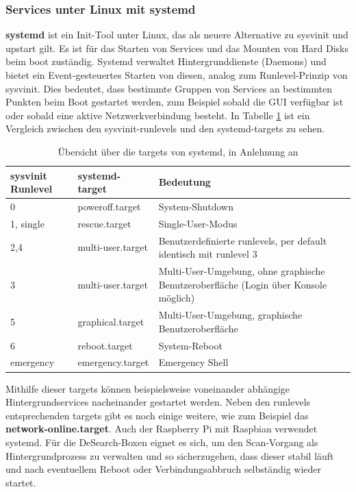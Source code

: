 \subsubsection{Services unter Linux mit systemd}\label{sssec:systemd}
\textbf{systemd} ist ein Init-Tool unter Linux, das als neuere Alternative zu sysvinit und upstart gilt. Es ist für das Starten von Services und das Mounten von Hard Disks beim boot zuständig. Systemd verwaltet Hintergrunddienste (Daemons) und bietet ein Event-gesteuertes Starten von diesen, analog zum Runlevel-Prinzip von sysvinit. Dies bedeutet, dass bestimmte Gruppen von Services an bestimmten Punkten beim Boot gestartet werden, zum Beispiel sobald die GUI verfügbar ist oder sobald eine aktive Netzwerkverbindung besteht. In Tabelle \ref{tab:lvl} ist ein Vergleich zwischen den sysvinit-runlevels und den systemd-targets zu sehen. 
\begin{table}[h]
	\begin{tabular}{|p{}|p{} |p{} | }
		\hline
		\textbf{sysvinit Runlevel} & \textbf{systemd-target} & \textbf{Bedeutung}\\ \hline
		0 & poweroff.target & System-Shutdown	\\ \hline
		1, single & rescue.target & Single-User-Modus \\ \hline
		2,4 & multi-user.target & Benutzerdefinierte runlevels, per default identisch mit runlevel 3 \\ \hline
		3 & multi-user.target & Multi-User-Umgebung, ohne graphische Benutzer\-oberfläche (Login über Konsole möglich)\\ \hline
		5 & graphical.target & Multi-User-Umgebung, graphische Benutzer\-oberfläche \\ \hline
		6 & reboot.target & System-Reboot \\ \hline
		emergency & emergency.target & Emergency Shell\\ \hline
		
	\end{tabular}
	\caption[Übersicht über die targets von systemd]{Übersicht über die targets von systemd, in Anlehnung an \cite{fedora}}
	\label{tab:lvl}
\end{table}
Mithilfe dieser targets können beispielsweise voneinander abhängige Hintergrundservices nacheinander gestartet werden. Neben den runlevels entsprechenden targets gibt es noch einige weitere, wie zum Beispiel das \textbf{network-online.target}.
Auch der Raspberry Pi mit Raspbian verwendet systemd. Für die DeSearch-Boxen eignet es sich, um den Scan-Vorgang als Hintergrundprozess zu verwalten und so sicherzugehen, dass dieser stabil läuft und nach eventuellem Reboot oder Verbindungsabbruch selbständig wieder startet.\newline
